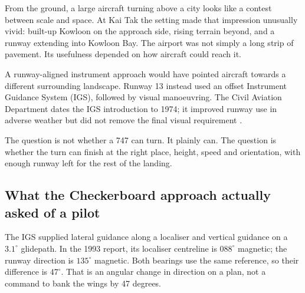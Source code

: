 \label{part:1}
From the ground, a large aircraft turning above a city looks like a contest between scale and space. At Kai Tak the setting made that impression unusually vivid: built-up Kowloon on the approach side, rising terrain beyond, and a runway extending into Kowloon Bay. The airport was not simply a long strip of pavement. Its usefulness depended on how aircraft could reach it.


A runway-aligned instrument approach would have pointed aircraft towards a different surrounding landscape. Runway 13 instead used an offset Instrument Guidance System (IGS), followed by visual manoeuvring. The Civil Aviation Department dates the IGS introduction to 1974; it improved runway use in adverse weather but did not remove the final visual requirement \citep{cadhistory,cad}.

The question is not whether a 747 can turn. It plainly can. The question is whether the turn can finish at the right place, height, speed and orientation, with enough runway left for the rest of the landing.
\par\medskip
\subsection*{What the Checkerboard approach actually asked of a pilot}
The IGS supplied lateral guidance along a localiser and vertical guidance on a $3.1^\circ$ glidepath. In the 1993 report, its localiser centreline is $088^\circ$ magnetic; the runway direction is $135^\circ$ magnetic. Both bearings use the same reference, so their difference is $47^\circ$. That is an angular change in direction on a plan, not a command to bank the wings by 47 degrees.


